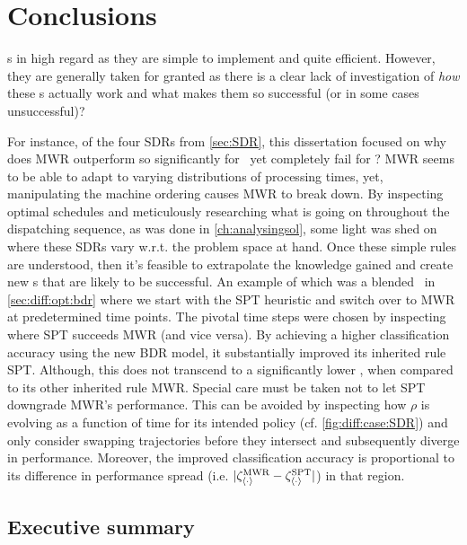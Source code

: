 
\chapter{Conclusions}\label{ch:conclusions} 
 \sdr s in high regard as they 
are simple to implement and quite efficient. 
However, they are generally taken for granted as there is a clear lack of 
investigation of \emph{how} these \dr s actually work and what 
makes them so successful (or in some cases unsuccessful)? 

For instance, of the four SDRs from \cref{sec:SDR}, this dissertation focused 
on why does MWR outperform so significantly for \jsp\, yet completely fail for 
\fsp? MWR seems to be able to adapt to varying distributions of processing times, 
yet, manipulating the machine ordering causes MWR to break down.
By inspecting optimal schedules and meticulously researching what is going on 
throughout the dispatching sequence, as was done in 
\cref{ch:analysingsol}, some light was shed on where these SDRs vary w.r.t. the 
problem space at hand. 
Once these simple rules are understood, then it's feasible to extrapolate the 
knowledge gained and create new \cdr s that are likely to be successful. 
An example of which was a blended \dr\ in \cref{sec:diff:opt:bdr} where we 
start with the SPT heuristic and switch over to MWR at predetermined time 
points. The pivotal time steps were chosen by inspecting where SPT succeeds 
MWR (and vice versa).
By achieving a higher classification accuracy using the new BDR model, it 
substantially improved its inherited rule SPT.
Although, this does not transcend to a significantly lower \namerho, when compared 
to its other inherited rule MWR. 
Special care must be taken not to let SPT downgrade MWR's performance. This can 
be avoided by inspecting how $\rho$ is evolving as a function of time for its 
intended policy (cf. \cref{fig:diff:case:SDR}) and only consider swapping 
trajectories before they intersect and subsequently diverge in performance. 
Moreover, the improved classification accuracy is proportional to its 
difference in performance spread (i.e. 
$\lvert\zeta^{\text{MWR}}_{\langle \cdot \rangle} - \zeta^{\text{SPT}}_{\langle \cdot \rangle}\rvert$) in that region.

\section{Executive summary}

